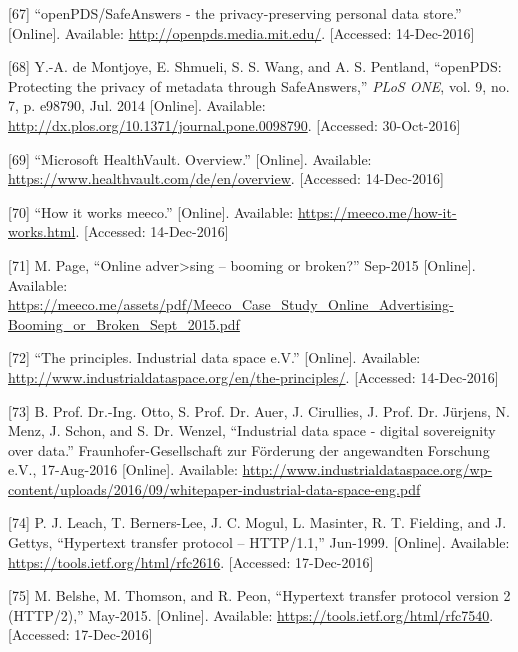 \documentclass[12pt,english,a4paper,titlepage,cleardoublepage=empty,dottedtoc]{report}
\begin{document}
\hypertarget{ref-web_mit_openpds-safeanswers-project-page}{}
{[}67{]} ``openPDS/SafeAnswers - the privacy-preserving personal data
store.'' {[}Online{]}. Available: \url{http://openpds.media.mit.edu/}.
{[}Accessed: 14-Dec-2016{]}

\hypertarget{ref-paper_2014_openpds_protecting-privacy-of-meta-data-through-safeanswers}{}
{[}68{]} Y.-A. de Montjoye, E. Shmueli, S. S. Wang, and A. S. Pentland,
``openPDS: Protecting the privacy of metadata through SafeAnswers,''
\emph{PLoS ONE}, vol. 9, no. 7, p. e98790, Jul. 2014 {[}Online{]}.
Available: \url{http://dx.plos.org/10.1371/journal.pone.0098790}.
{[}Accessed: 30-Oct-2016{]}

\hypertarget{ref-web_microsoft_healthvault}{}
{[}69{]} ``Microsoft HealthVault. Overview.'' {[}Online{]}. Available:
\url{https://www.healthvault.com/de/en/overview}. {[}Accessed:
14-Dec-2016{]}

\hypertarget{ref-web_meeco_how-it-works}{}
{[}70{]} ``How it works meeco.'' {[}Online{]}. Available:
\url{https://meeco.me/how-it-works.html}. {[}Accessed: 14-Dec-2016{]}

\hypertarget{ref-slides_2015_meeco-case-study}{}
{[}71{]} M. Page, ``Online adver\textgreater{}sing -- booming or
broken?'' Sep-2015 {[}Online{]}. Available:
\url{https://meeco.me/assets/pdf/Meeco_Case_Study_Online_Advertising-Booming_or_Broken_Sept_2015.pdf}

\hypertarget{ref-web_industrial-data-space}{}
{[}72{]} ``The principles. Industrial data space e.V.'' {[}Online{]}.
Available: \url{http://www.industrialdataspace.org/en/the-principles/}.
{[}Accessed: 14-Dec-2016{]}

\hypertarget{ref-whitepaper_2016_industrial-data-space}{}
{[}73{]} B. Prof. Dr.-Ing. Otto, S. Prof. Dr. Auer, J. Cirullies, J.
Prof. Dr. Jürjens, N. Menz, J. Schon, and S. Dr. Wenzel, ``Industrial
data space - digital sovereignity over data.'' Fraunhofer-Gesellschaft
zur Förderung der angewandten Forschung e.V., 17-Aug-2016 {[}Online{]}.
Available:
\url{http://www.industrialdataspace.org/wp-content/uploads/2016/09/whitepaper-industrial-data-space-eng.pdf}

\hypertarget{ref-web_spec_http1}{}
{[}74{]} P. J. Leach, T. Berners-Lee, J. C. Mogul, L. Masinter, R. T.
Fielding, and J. Gettys, ``Hypertext transfer protocol -- HTTP/1.1,''
Jun-1999. {[}Online{]}. Available:
\url{https://tools.ietf.org/html/rfc2616}. {[}Accessed: 17-Dec-2016{]}

\hypertarget{ref-web_spec_http2}{}
{[}75{]} M. Belshe, M. Thomson, and R. Peon, ``Hypertext transfer
protocol version 2 (HTTP/2),'' May-2015. {[}Online{]}. Available:
\url{https://tools.ietf.org/html/rfc7540}. {[}Accessed: 17-Dec-2016{]}
\end{document}
